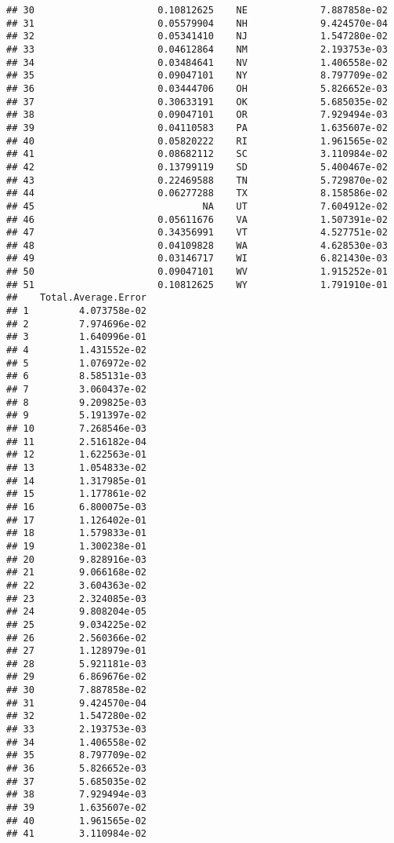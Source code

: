 \documentclass{article}\usepackage[]{graphicx}\usepackage[]{color}
\makeatletter
\newenvironment{kframe}{%
 \def\at@end@of@kframe{}%
 \ifinner\ifhmode%
  \def\at@end@of@kframe{\end{minipage}}%
  \begin{minipage}{\columnwidth}%
 \fi\fi%
 \def\FrameCommand##1{\hskip\@totalleftmargin \hskip-\fboxsep
 \colorbox{shadecolor}{##1}\hskip-\fboxsep
     \hskip-\linewidth \hskip-\@totalleftmargin \hskip\columnwidth}%
 \MakeFramed {\advance\hsize-\width
   \@totalleftmargin\z@ \linewidth\hsize
   \@setminipage}}%
 {\par\unskip\endMakeFramed%
 \at@end@of@kframe}
\newenvironment{knitrout}{}{} %
\makeatother
\begin{document}
\begin{knitrout}
\begin{kframe}
\begin{verbatim}
## 30                      0.10812625    NE             7.887858e-02
## 31                      0.05579904    NH             9.424570e-04
## 32                      0.05341410    NJ             1.547280e-02
## 33                      0.04612864    NM             2.193753e-03
## 34                      0.03484641    NV             1.406558e-02
## 35                      0.09047101    NY             8.797709e-02
## 36                      0.03444706    OH             5.826652e-03
## 37                      0.30633191    OK             5.685035e-02
## 38                      0.09047101    OR             7.929494e-03
## 39                      0.04110583    PA             1.635607e-02
## 40                      0.05820222    RI             1.961565e-02
## 41                      0.08682112    SC             3.110984e-02
## 42                      0.13799119    SD             5.400467e-02
## 43                      0.22469588    TN             5.729870e-02
## 44                      0.06277288    TX             8.158586e-02
## 45                              NA    UT             7.604912e-02
## 46                      0.05611676    VA             1.507391e-02
## 47                      0.34356991    VT             4.527751e-02
## 48                      0.04109828    WA             4.628530e-03
## 49                      0.03146717    WI             6.821430e-03
## 50                      0.09047101    WV             1.915252e-01
## 51                      0.10812625    WY             1.791910e-01
##    Total.Average.Error
## 1         4.073758e-02
## 2         7.974696e-02
## 3         1.640996e-01
## 4         1.431552e-02
## 5         1.076972e-02
## 6         8.585131e-03
## 7         3.060437e-02
## 8         9.209825e-03
## 9         5.191397e-02
## 10        7.268546e-03
## 11        2.516182e-04
## 12        1.622563e-01
## 13        1.054833e-02
## 14        1.317985e-01
## 15        1.177861e-02
## 16        6.800075e-03
## 17        1.126402e-01
## 18        1.579833e-01
## 19        1.300238e-01
## 20        9.828916e-03
## 21        9.066168e-02
## 22        3.604363e-02
## 23        2.324085e-03
## 24        9.808204e-05
## 25        9.034225e-02
## 26        2.560366e-02
## 27        1.128979e-01
## 28        5.921181e-03
## 29        6.869676e-02
## 30        7.887858e-02
## 31        9.424570e-04
## 32        1.547280e-02
## 33        2.193753e-03
## 34        1.406558e-02
## 35        8.797709e-02
## 36        5.826652e-03
## 37        5.685035e-02
## 38        7.929494e-03
## 39        1.635607e-02
## 40        1.961565e-02
## 41        3.110984e-02

\end{verbatim}
\end{kframe}
\end{knitrout}
\end{document}
